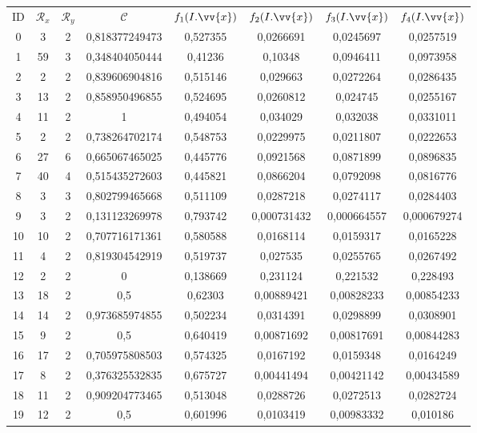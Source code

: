 \scriptsize
\begin{longtable}{|c|c|c|c|c|c|c|c|}
\hline
ID & $\mathscr{R}_x$ & $\mathscr{R}_y$ & $\mathscr{C}$ & $f_1(I.\vv{x})$ & $f_2(I.\vv{x})$ & $f_3(I.\vv{x})$ & $f_4(I.\vv{x})$ \\
0 & 3 & 2 & 0,818377249473 & 0,527355 & 0,0266691 & 0,0245697 & 0,0257519  \\
1 & 59 & 3 & 0,348404050444 & 0,41236 & 0,10348 & 0,0946411 & 0,0973958  \\
2 & 2 & 2 & 0,839606904816 & 0,515146 & 0,029663 & 0,0272264 & 0,0286435  \\
3 & 13 & 2 & 0,858950496855 & 0,524695 & 0,0260812 & 0,024745 & 0,0255167  \\
4 & 11 & 2 & 1 & 0,494054 & 0,034029 & 0,032038 & 0,0331011  \\
5 & 2 & 2 & 0,738264702174 & 0,548753 & 0,0229975 & 0,0211807 & 0,0222653  \\
6 & 27 & 6 & 0,665067465025 & 0,445776 & 0,0921568 & 0,0871899 & 0,0896835  \\
7 & 40 & 4 & 0,515435272603 & 0,445821 & 0,0866204 & 0,0792098 & 0,0816776  \\
8 & 3 & 3 & 0,802799465668 & 0,511109 & 0,0287218 & 0,0274117 & 0,0284403  \\
9 & 3 & 2 & 0,131123269978 & 0,793742 & 0,000731432 & 0,000664557 & 0,000679274  \\
10 & 10 & 2 & 0,707716171361 & 0,580588 & 0,0168114 & 0,0159317 & 0,0165228  \\
11 & 4 & 2 & 0,819304542919 & 0,519737 & 0,027535 & 0,0255765 & 0,0267492  \\
12 & 2 & 2 & 0 & 0,138669 & 0,231124 & 0,221532 & 0,228493  \\
13 & 18 & 2 & 0,5 & 0,62303 & 0,00889421 & 0,00828233 & 0,00854233  \\
14 & 14 & 2 & 0,973685974855 & 0,502234 & 0,0314391 & 0,0298899 & 0,0308901  \\
15 & 9 & 2 & 0,5 & 0,640419 & 0,00871692 & 0,00817691 & 0,00844283  \\
16 & 17 & 2 & 0,705975808503 & 0,574325 & 0,0167192 & 0,0159348 & 0,0164249  \\
17 & 8 & 2 & 0,376325532835 & 0,675727 & 0,00441494 & 0,00421142 & 0,00434589  \\
18 & 11 & 2 & 0,909204773465 & 0,513048 & 0,0288726 & 0,0272513 & 0,0282724  \\
19 & 12 & 2 & 0,5 & 0,601996 & 0,0103419 & 0,00983332 & 0,010186  \\

\end{longtable}
